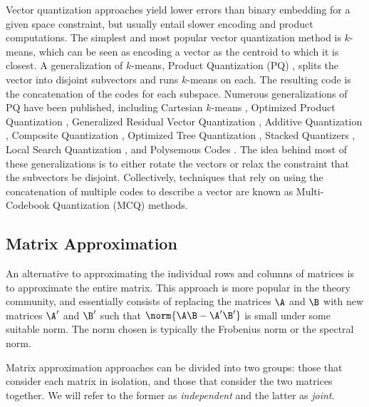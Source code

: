 Vector quantization approaches yield lower errors than binary embedding for a given space constraint, but usually entail slower encoding and product computations. The simplest and most popular vector quantization method is $k$-means, which can be seen as encoding a vector as the centroid to which it is closest. A generalization of $k$-means, Product Quantization (PQ) \cite{pq}, splits the vector into disjoint subvectors and runs $k$-means on each. The resulting code is the concatenation of the codes for each subspace. Numerous generalizations of PQ have been published, including Cartesian $k$-means \cite{cartesianKmeans}, Optimized Product Quantization \cite{opq},  Generalized Residual Vector Quantization \cite{grvq}, Additive Quantization \cite{aq}, Composite Quantization \cite{cq}, Optimized Tree Quantization \cite{otq}, Stacked Quantizers \cite{stackedQuantizers}, Local Search Quantization \cite{lsq}, and Polysemous Codes \cite{polysemous}. The idea behind most of these generalizations is to either rotate the vectors or relax the constraint that the subvectors be disjoint. Collectively, techniques that rely on using the concatenation of multiple codes to describe a vector are known as Multi-Codebook Quantization (MCQ) methods. %


\subsection{Matrix Approximation}

An alternative to approximating the individual rows and columns of matrices is to approximate the entire matrix. This approach is more popular in the theory community, and essentially consists of replacing the matrices $\A$ and $\B$ with new matrices $\A^\prime$ and $\B^\prime$ such that $\norm{\A\B - \A^\prime \B^\prime}$ is small under some suitable norm. The norm chosen is typically the Frobenius norm or the spectral norm.

Matrix approximation approaches can be divided into two groups: those that consider each matrix in isolation, and those that consider the two matrices together. We will refer to the former as \emph{independent} and the latter as \emph{joint}.

